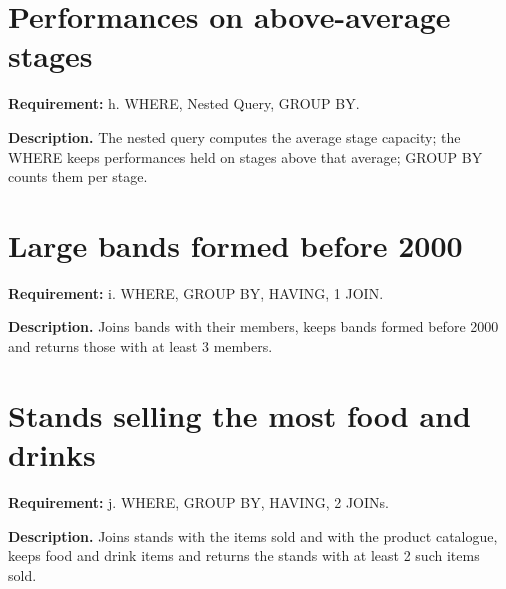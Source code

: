 

\section{Performances on above-average stages}
\textbf{Requirement:} h. WHERE, Nested Query, GROUP BY.

\textbf{Description.} The nested query computes the average stage capacity; the WHERE keeps performances held on stages above that average; GROUP BY counts them per stage. 



\section{Large bands formed before 2000}
\textbf{Requirement:} i. WHERE, GROUP BY, HAVING, 1 JOIN.

\textbf{Description.} Joins bands with their members, keeps bands formed before 2000 and returns those with at least 3 members. 



\section{Stands selling the most food and drinks}
\textbf{Requirement:} j. WHERE, GROUP BY, HAVING, 2 JOINs.

\textbf{Description.} Joins stands with the items sold and with the product catalogue, keeps food and drink items and returns the stands with at least 2 such items sold. 



